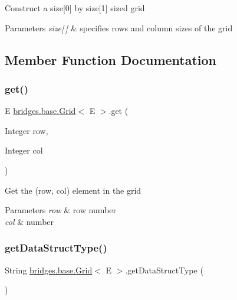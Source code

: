 Construct a size\mbox{[}0\mbox{]} by size\mbox{[}1\mbox{]} sized grid 
\begin{DoxyParams}{Parameters}
{\em size\mbox{[}$\,$\mbox{]}} & specifies rows and column sizes of the grid \\
\hline
\end{DoxyParams}


\subsection{Member Function Documentation}
\mbox{\label{classbridges_1_1base_1_1_grid_a698579bb5b7166f76a18a1b04916e090}} 
\subsubsection{\texorpdfstring{get()}{get()}}
{\footnotesize\ttfamily E \mbox{\hyperlink{classbridges_1_1base_1_1_grid}{bridges.\+base.\+Grid}}$<$ E $>$.get (\begin{DoxyParamCaption}\item[{Integer}]{row,  }\item[{Integer}]{col }\end{DoxyParamCaption})}

Get the (row, col) element in the grid 
\begin{DoxyParams}{Parameters}
{\em row} & row number \\
\hline
{\em col} & number \\
\hline
\end{DoxyParams}
\mbox{\label{classbridges_1_1base_1_1_grid_a81f268dd27c292ff2af9358039d4ebe6}} 
\subsubsection{\texorpdfstring{getDataStructType()}{getDataStructType()}}
{\footnotesize\ttfamily String \mbox{\hyperlink{classbridges_1_1base_1_1_grid}{bridges.\+base.\+Grid}}$<$ E $>$.get\+Data\+Struct\+Type (\begin{DoxyParamCaption}{ }\end{DoxyParamCaption})}

